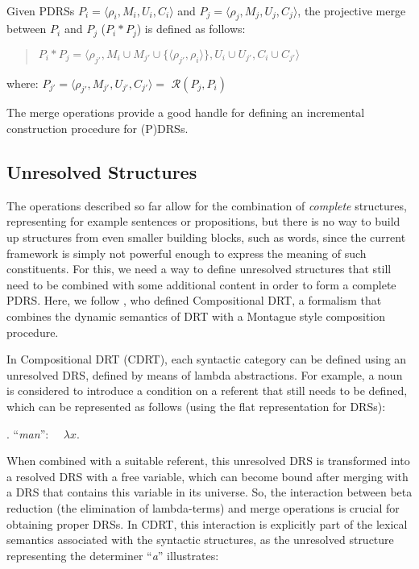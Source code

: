\begin{definition}\label{def:pmerge}~\\
Given PDRSs $P_i=\langle \rho_i,M_i,U_i,C_i \rangle$ and 
$P_j=\langle \rho_j,M_j,U_j,C_j\rangle$, the projective merge between $P_i$
and $P_j$ ($P_i \ast P_j$) is defined as follows:
  \begin{quote}
    $P_i \ast P_j = 
      \langle \rho_{j'}, 
        M_{i}\cup M_{j'}\cup\{\langle\rho_{j'},\rho_{i}\rangle\}, 
        U_{i}\cup U_{j'},C_{i} \cup C_{j'}\rangle$
  \end{quote}
  where: $P_{j'} = \langle \rho_{j'}, M_{j'}, U_{j'}, C_{j'} \rangle =$ 
      $\mathcal{R}(P_j,P_i)$
\end{definition}

The merge operations provide a good handle for defining an incremental
construction procedure for (P)DRSs.


\subsection{Unresolved Structures}

The operations described so far allow for the combination of \emph{complete}
structures, representing for example sentences or propositions, but there is
no way to build up structures from even smaller building blocks, such as
words, since the current framework is simply not powerful enough to express
the meaning of such constituents. For this, we need a way to define
unresolved structures that still need to be combined with some additional
content in order to form a complete PDRS.  Here, we follow
, who defined Compositional DRT,
a formalism that combines the dynamic semantics of DRT with a Montague style
composition procedure.

In Compositional DRT (CDRT), each syntactic category can be defined using an
unresolved DRS, defined by means of lambda abstractions. For example, a noun
is considered to introduce a condition on a referent that still needs to be
defined, which can be represented as follows (using the flat representation
for DRSs): 

\ex. ``\textit{man}'':~~ $\lambda x.$

When combined with a suitable referent, this unresolved DRS is transformed
into a resolved DRS with a free variable, which can become bound after
merging with a DRS that contains this variable in its universe. So, the
interaction between beta reduction (the elimination of lambda-terms) and
merge operations is crucial for obtaining proper DRSs. In CDRT, this
interaction is explicitly part of the lexical semantics associated with the
syntactic structures, as the unresolved structure representing the
determiner ``\textit{a}'' illustrates: 

